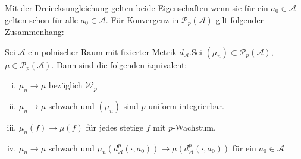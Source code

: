 Mit der Dreiecksungleichung gelten beide Eigenschaften wenn sie für ein $a_0 \in \mathcal{A}$ gelten schon für alle $a_0 \in \mathcal{A}$.
Für Konvergenz in $\mathcal{P}_p(\mathcal{A})$ gilt folgender Zusammenhang:
\begin{lemma}\label{thm:conv_char}
Sei $\mathcal{A}$ ein polnischer Raum mit fixierter Metrik $d_\mathcal{A}$.Sei $(\mu_n) \subset \mathcal{P}_p(\mathcal{A})$, $\mu \in \mathcal{P}_p(\mathcal{A})$. Dann sind die folgenden äquivalent:
\begin{enumerate}[(i)]
    \item $\mu_n \rightarrow \mu$ bezüglich $\mathcal{W}_p$
    \item $\mu_n \rightarrow \mu$ schwach und $(\mu_n)$ sind $p$-uniform integrierbar.
    \item $\mu_n(f) \rightarrow \mu(f)$ für jedes stetige $f$ mit $p$-Wachstum.
    \item $\mu_n \rightarrow \mu$ schwach und $\mu_n(d_\mathcal{A}^p(\cdot, a_0)) \rightarrow \mu(d_\mathcal{A}^p(\cdot, a_0))$ für ein $a_0 \in \mathcal{A}$
\end{enumerate}
\end{lemma}
